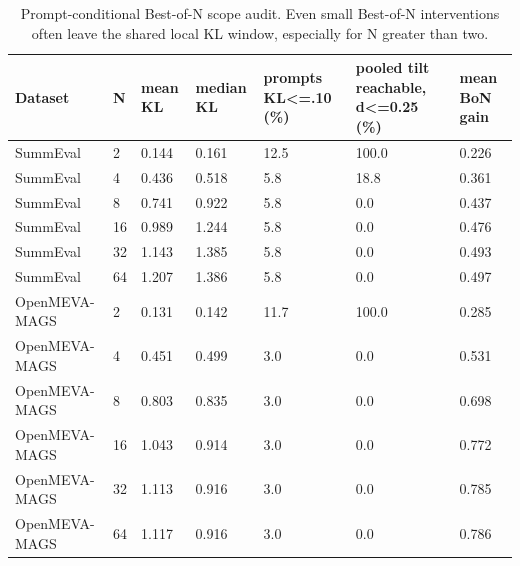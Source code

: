 \begin{table}[t]
\centering
\small
\begin{tabular}{lllllll}
\toprule
Dataset & N & mean KL & median KL & prompts KL<=.10 (\%) & pooled tilt reachable, d<=0.25 (\%) & mean BoN gain \\
\midrule
SummEval & 2 & 0.144 & 0.161 & 12.5 & 100.0 & 0.226 \\
SummEval & 4 & 0.436 & 0.518 & 5.8 & 18.8 & 0.361 \\
SummEval & 8 & 0.741 & 0.922 & 5.8 & 0.0 & 0.437 \\
SummEval & 16 & 0.989 & 1.244 & 5.8 & 0.0 & 0.476 \\
SummEval & 32 & 1.143 & 1.385 & 5.8 & 0.0 & 0.493 \\
SummEval & 64 & 1.207 & 1.386 & 5.8 & 0.0 & 0.497 \\
OpenMEVA-MAGS & 2 & 0.131 & 0.142 & 11.7 & 100.0 & 0.285 \\
OpenMEVA-MAGS & 4 & 0.451 & 0.499 & 3.0 & 0.0 & 0.531 \\
OpenMEVA-MAGS & 8 & 0.803 & 0.835 & 3.0 & 0.0 & 0.698 \\
OpenMEVA-MAGS & 16 & 1.043 & 0.914 & 3.0 & 0.0 & 0.772 \\
OpenMEVA-MAGS & 32 & 1.113 & 0.916 & 3.0 & 0.0 & 0.785 \\
OpenMEVA-MAGS & 64 & 1.117 & 0.916 & 3.0 & 0.0 & 0.786 \\
\bottomrule
\end{tabular}
\caption{Prompt-conditional Best-of-N scope audit. Even small Best-of-N interventions often leave the shared local KL window, especially for N greater than two.}
\label{tab:prompt-conditional-bon-scope}
\end{table}
